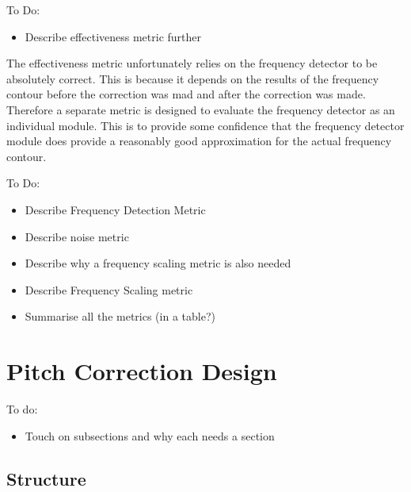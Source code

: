 
\color{red}
To Do:
\begin{itemize}
	\item Describe effectiveness metric further
\end{itemize}
\color{black}

The effectiveness metric unfortunately relies on the frequency detector to be
absolutely correct. This is because it depends on the results of the frequency
contour before the correction was mad and after the correction was made. Therefore
a separate metric is designed to evaluate the frequency detector as an individual
module.  This is to provide some confidence that the frequency detector module
does provide a reasonably good approximation for the actual frequency contour.

\color{red}
To Do:
\begin{itemize}
	\item Describe Frequency Detection Metric
	\item Describe noise metric
	\item Describe why a frequency scaling metric is also needed
	\item Describe Frequency Scaling metric
	\item Summarise all the metrics (in a table?)
\end{itemize}
\color{black}

\section{Pitch Correction Design}

\color{red}
To do:
\begin{itemize}
	\item Touch on subsections and why each needs a section
\end{itemize}
\color{black}

\subsection{Structure}

